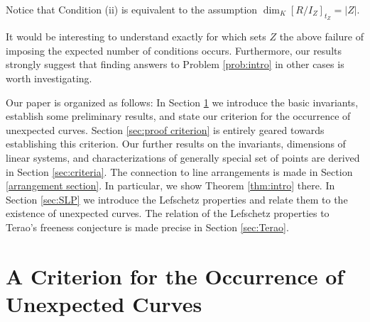 \documentclass[12pt]{amsart}
\numberwithin{equation}{section}
\theoremstyle{definition}
\begin{document}
\noindent
Notice that Condition (ii) is equivalent to the assumption $\dim_K [R/I_Z]_{t_Z} = |Z|$. 

It would be interesting to understand exactly for which sets $Z$ the above failure of imposing the expected number of conditions occurs. Furthermore, our results strongly suggest that finding  answers to Problem \ref{prob:intro} in other cases is worth investigating. 
\smallskip 

Our paper is organized as follows: In Section \ref{sec:mult ind} we introduce the basic invariants, establish some preliminary results, and state our criterion for the occurrence of unexpected curves. Section \ref{sec:proof criterion} is entirely geared towards establishing this criterion. Our further results on the invariants, dimensions of linear systems, and characterizations of generally special set of points are derived in Section \ref{sec:criteria}.   The connection to line arrangements is made in Section \ref{arrangement section}. In particular, we show Theorem \ref{thm:intro} there.  In Section \ref{sec:SLP} we introduce the Lefschetz properties and relate them to the existence of unexpected curves. The relation of the Lefschetz properties to Terao's freeness conjecture is made precise in Section \ref{sec:Terao}. 

\section{A Criterion for the Occurrence of Unexpected Curves} 
\label{sec:mult ind} 
\end{document}
